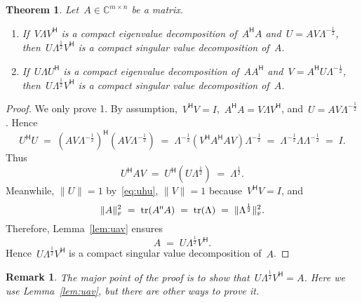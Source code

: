 \documentclass[11pt,a4paper]{article}  %
\numberwithin{equation}{section}
\newtheorem{theorem}{Theorem}%
\newtheorem{remark}{Remark}%
\theoremstyle{definition}
\def\CC{\mathbb{C}}
\DeclareMathOperator{\tr}{tr}
\newcommand{\fro}{{\scriptscriptstyle{\textnormal{F}}}}
\newcommand{\hmt}{{\scriptscriptstyle{{\mathsf{H}}}}}
\begin{document}
\begin{theorem}
  \label{th:ey}
  Let~$A \in \CC^{m\times n}$ be a matrix.
  \begin{enumerate}[leftmargin=1.5em]
  \item If~$V\Lambda V^\hmt$ is a compact eigenvalue decomposition of~$A^\hmt A$ and~$U = AV\Lambda^{-\frac{1}{2}}$,
    then~$U\Lambda^\frac{1}{2} V^\hmt$ is a compact singular value decomposition of~$A$.
  \item If~$U\Lambda U^\hmt$ is a compact eigenvalue decomposition of~$AA^\hmt$ and~$V = A^\hmt U\Lambda^{-\frac{1}{2}}$,
    then~$U\Lambda^\frac{1}{2} V^\hmt$ is a compact singular value decomposition of~$A$.
  \end{enumerate}
\end{theorem}

\begin{proof}
  We only prove 1. By assumption,~$V^\hmt V=I$,~$A^\hmt A = V\Lambda V^\hmt$,
  and~$U = A V\Lambda^{-\frac{1}{2}}$. Hence
  \begin{equation}
    \label{eq:uhu}
    U^\hmt U \;=\;  (A V\Lambda^{-\frac{1}{2}})^\hmt  (AV\Lambda^{-\frac{1}{2}})
    \;=\; \Lambda^{-\frac{1}{2}}(V^\hmt A^\hmt A V)\Lambda^{-\frac{1}{2}}
    \;=\; \Lambda^{-\frac{1}{2}}\Lambda\Lambda^{-\frac{1}{2}} \;=\; I.
  \end{equation}
  Thus
  \begin{equation*}
    U^\hmt A V \;=\; U^\hmt (U\Lambda^{\frac{1}{2}}) \;=\; \Lambda^{\frac{1}{2}}.
  \end{equation*}
  Meanwhile, $\|U\|=1$ by~\eqref{eq:uhu}, $\|V\|=1$ because~$V^\hmt V = I$, and
  \begin{equation*}
    \|A\|_\fro^2 \;=\; \tr(A^\hmt A) \;=\; \tr(\Lambda) \;=\; \|\Lambda^{\frac{1}{2}}\|_\fro^2.
  \end{equation*}
  Therefore, Lemma~\ref{lem:uav} ensures
  \begin{equation}
    \nonumber
    A \;=\; U\Lambda^{\frac{1}{2}}V^\hmt.
  \end{equation}
  Hence~$U\Lambda^{\frac{1}{2}}V^\hmt$ is a compact singular value decomposition of~$A$.
\end{proof}

\begin{remark}
The major point of the proof is to show that~$U\Lambda^{\frac{1}{2}}V^\hmt =A$. Here we use
Lemma~\ref{lem:uav}, but there are other ways to prove it.
\end{remark}
\end{document}
